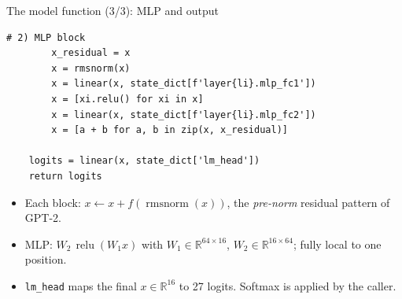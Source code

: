 \documentclass[aspectratio=169,11pt]{beamer}
\newcommand{\R}{\mathbb{R}}
\newcommand{\rmsnorm}{\operatorname{rmsnorm}}
\newcommand{\relu}{\operatorname{relu}}
\begin{document}
\begin{frame}[fragile]{The model function (3/3): MLP and output}
\begin{lstlisting}[basicstyle=\ttfamily\scriptsize]
        # 2) MLP block
        x_residual = x
        x = rmsnorm(x)
        x = linear(x, state_dict[f'layer{li}.mlp_fc1'])
        x = [xi.relu() for xi in x]
        x = linear(x, state_dict[f'layer{li}.mlp_fc2'])
        x = [a + b for a, b in zip(x, x_residual)]

    logits = linear(x, state_dict['lm_head'])
    return logits
\end{lstlisting}
\begin{itemize}
  \item Each block: $x \leftarrow x + f(\rmsnorm(x))$, the \emph{pre-norm} residual pattern of GPT-2.
  \item MLP: $W_2\,\relu(W_1 x)$ with $W_1\in\R^{64\times16}$, $W_2\in\R^{16\times64}$; fully local to one position.
  \item \texttt{lm\_head} maps the final $x\in\R^{16}$ to 27 logits. Softmax is applied by the caller.
\end{itemize}
\end{frame}
\end{document}
